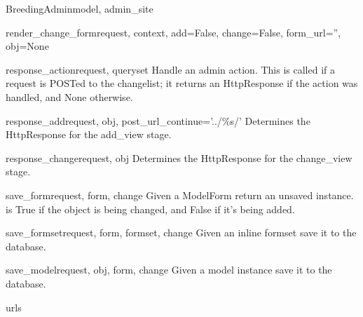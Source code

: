 \documentclass[letterpaper,10pt,english]{sphinxmanual}
\begin{document}
\begin{classdesc}{BreedingAdmin}{model, admin\_site}
\hypertarget{animal.admin.BreedingAdmin.render_change_form}{}\begin{methoddesc}{render\_change\_form}{request, context, add=False, change=False, form\_url='', obj=None}\end{methoddesc}

\hypertarget{animal.admin.BreedingAdmin.response_action}{}\begin{methoddesc}{response\_action}{request, queryset}
Handle an admin action. This is called if a request is POSTed to the
changelist; it returns an HttpResponse if the action was handled, and
None otherwise.
\end{methoddesc}

\hypertarget{animal.admin.BreedingAdmin.response_add}{}\begin{methoddesc}{response\_add}{request, obj, post\_url\_continue='../\%s/'}
Determines the HttpResponse for the add\_view stage.
\end{methoddesc}

\hypertarget{animal.admin.BreedingAdmin.response_change}{}\begin{methoddesc}{response\_change}{request, obj}
Determines the HttpResponse for the change\_view stage.
\end{methoddesc}

\hypertarget{animal.admin.BreedingAdmin.save_form}{}\begin{methoddesc}{save\_form}{request, form, change}
Given a ModelForm return an unsaved instance.  is True if
the object is being changed, and False if it's being added.
\end{methoddesc}

\hypertarget{animal.admin.BreedingAdmin.save_formset}{}\begin{methoddesc}{save\_formset}{request, form, formset, change}
Given an inline formset save it to the database.
\end{methoddesc}

\hypertarget{animal.admin.BreedingAdmin.save_model}{}\begin{methoddesc}{save\_model}{request, obj, form, change}
Given a model instance save it to the database.
\end{methoddesc}

\hypertarget{animal.admin.BreedingAdmin.urls}{}\begin{memberdesc}{urls}\end{memberdesc}
\end{classdesc}
\end{document}
